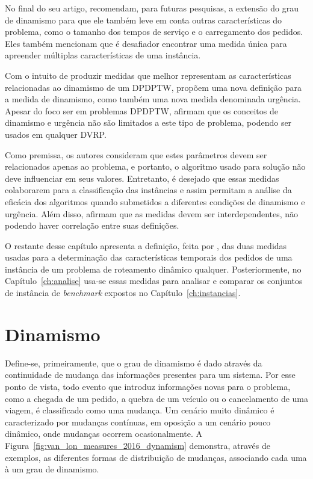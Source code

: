 No final do seu artigo,  recomendam, 
para futuras pesquisas, a extensão do grau de dinamismo para que ele também 
leve em conta outras características do problema, como o tamanho dos tempos de 
serviço e o carregamento dos pedidos.
Eles também mencionam que é desafiador encontrar uma medida única para 
apreender múltiplas características de uma instância.

Com o intuito de produzir medidas que melhor representam as características
relacionadas ao dinamismo de um DPDPTW,  
propõem uma nova definição para a medida de dinamismo, como também uma nova
medida denominada urgência.
Apesar do foco ser em problemas DPDPTW, 
afirmam que os conceitos de dinamismo e urgência não são limitados a este tipo
de problema, podendo ser usados em qualquer DVRP.

Como premissa, os autores consideram que estes parâmetros devem ser 
relacionados apenas ao problema, e portanto, o algoritmo usado para solução 
não deve influenciar em seus valores.
Entretanto, é desejado que essas medidas colaborarem para a classificação das 
instâncias e assim permitam a análise da eficácia dos algoritmos quando 
submetidos a diferentes condições de dinamismo e urgência. 
Além disso,  afirmam que as medidas devem ser 
interdependentes, não podendo haver correlação entre suas definições. 

O restante desse capítulo apresenta a definição, feita por
, das duas medidas usadas para a determinação
das características temporais dos pedidos de uma instância de um problema de 
roteamento dinâmico qualquer.
Posteriormente, no Capítulo~\ref{ch:analise} usa-se essas medidas para analisar
e comparar os conjuntos de instância de \textit{benchmark} expostos no 
Capítulo~\ref{ch:instancias}.






\section{Dinamismo}\label{sec:dinamismo}
Define-se, primeiramente, que o grau de dinamismo é dado através da 
continuidade de mudança das informações presentes para um sistema. 
Por esse ponto de vista, todo evento que introduz informações novas para o 
problema, como a chegada de um pedido, a quebra de um veículo ou o cancelamento
de uma viagem, é classificado como uma mudança.
Um cenário muito dinâmico é caracterizado por mudanças contínuas, em oposição a
um cenário pouco dinâmico, onde mudanças ocorrem ocasionalmente.
A Figura~\ref{fig:van_lon_measures_2016_dynamism} demonstra, 
através de exemplos, as diferentes formas de distribuição de mudanças,
associando cada uma à um grau de dinamismo.

